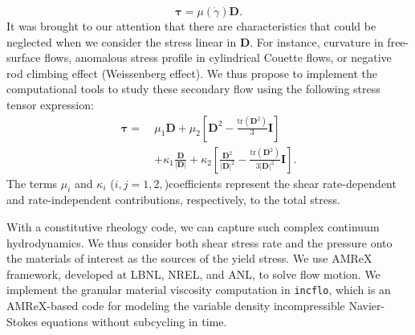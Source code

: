 \begin{equation}
   \boldsymbol{\tau} = \mu(\dot{\gamma}) \boldsymbol{D}.
\end{equation}
It was brought to our attention that there are characteristics that could be neglected when we consider the stress linear in $\boldsymbol{D}$. For instance, curvature in free-surface flows, anomalous stress profile in cylindrical Couette flows, or negative rod climbing effect (Weissenberg effect). We thus propose to implement the computational tools to study these secondary flow using the following stress tensor expression:
\begin{align}
  {\bm  \tau}
  =  \ &\mu_1 {\bm D} 
  + \mu_2  \left[ {\bm D}^2  - \frac{\text{tr}\left({\bm D}^2\right)}{3}{\bm I} \right]
  \nonumber \\
  & + \kappa_1 \frac{{\bm D}}{|{\bm D}|} 
  + \kappa_2  \left[ \frac{{\bm D}^2}{|{\bm D}|^2}  
  - \frac{\text{tr}\left({\bm D}^2\right)}{3|{\bm D}|^2}{\bm I} \right].
\end{align}
The terms $\mu_i$ and $\kappa_i$ ($i, j = 1,2,$)coefficients represent the shear rate-dependent and rate-independent contributions, respectively, to the total stress.
\par
With a constitutive rheology code, we can capture such complex continuum hydrodynamics. We thus consider both shear stress rate and the pressure onto the materials of interest as the sources of the yield stress. 
We use AMReX framework, developed at LBNL, NREL, and ANL, to solve flow motion. We implement the granular material viscosity computation in \verb+incflo+, which is an AMReX-based code for modeling the variable density incompressible Navier-Stokes equations without subcycling in time.



